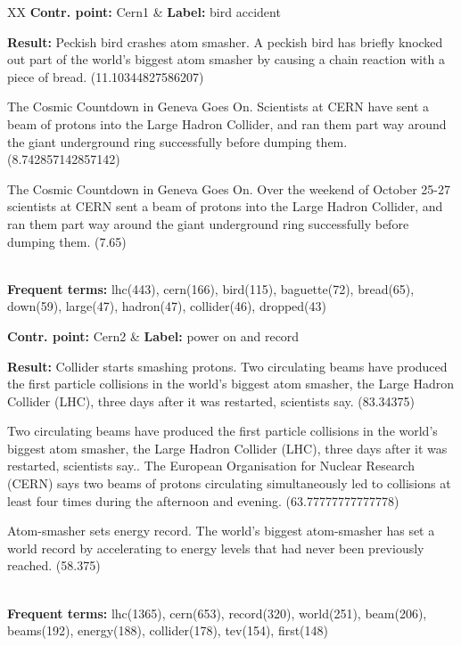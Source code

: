 
\begin{table*}
	\centering
	\begin{tabularx}{\textwidth}{XX}
\hline
\textbf{Contr. point:} Cern1 & \textbf{Label:} bird accident\\
	{\textbf{Result:} Peckish bird crashes atom smasher. A peckish bird has
	briefly knocked out part of the world's biggest atom smasher by causing a
	chain reaction with a piece of bread. (11.10344827586207) 

The Cosmic Countdown in Geneva Goes On. Scientists at CERN have sent a beam of
protons into the Large Hadron Collider, and ran them part way around the giant
underground ring successfully before dumping them. (8.742857142857142) 

The Cosmic Countdown in Geneva Goes On. Over the weekend of October 25-27
scientists at CERN sent a beam of protons into the Large Hadron Collider, and
ran them part way around the giant underground ring successfully before dumping
them. (7.65) } \\
{\textbf{Frequent terms:} lhc(443), cern(166), bird(115), baguette(72),
bread(65), down(59), large(47), hadron(47), collider(46), dropped(43)}\\
\hline

\textbf{Contr. point:} Cern2 & \textbf{Label:} power on and record \\
{\textbf{Result:}  
Collider starts smashing protons. Two circulating beams have produced the first
particle collisions in the world's biggest atom smasher, the Large Hadron
Collider (LHC), three days after it was restarted, scientists say. (83.34375) 

Two circulating beams have produced the first particle collisions in the world's
biggest atom smasher, the Large Hadron Collider (LHC), three days after it was
restarted, scientists say.. The European Organisation for Nuclear Research
(CERN) says two beams of protons circulating simultaneously led to collisions at
least four times during the afternoon and evening. (63.77777777777778)

Atom-smasher sets energy record. The world's biggest atom-smasher has set a
world record by accelerating to energy levels that had never been previously
reached. (58.375)
} \\
{\textbf{Frequent terms:} lhc(1365), cern(653), record(320), world(251),
beam(206), beams(192), energy(188), collider(178), tev(154), first(148)} \\
\hline


\end{tabularx}
\end{table*}
